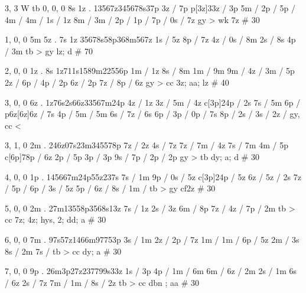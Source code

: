 3, 3
W 
tb  
0, 0, 0
8s 1z . 
13567z345678s37p
3z / 7p 
p[3z]33z / 3p
5m /
2p / 
5p / 
4m / 
4m /  
1s / 1z 
8m / 
3m / 
2p / 
1p / 
7p / 
0s / 7z 
gy > wk 
7z # 30 

1, 0, 0
5m 5z . 7s 1z
35678s58p368m567z 
1s / 5z 
8p / 7z 
4z / 
0s / 8m 
2s / 8s
4p / 3m 
tb > gy 
lz; d # 70 

2, 0, 0
1z . 8s
1z711s1589m22556p 
1m / 1z 
8s / 8m 
1m / 9m 
9m / 
4z / 
3m / 5p 
2z / 
6p / 
4p / 2p 
6z / 2p 
7z / 
8p / 6z 
gy > cc 
3z; aa; lz # 40

3, 0, 0
6z . 
1z76s2s66z33567m24p 
4z / 1z 
3z / 
5m / 4z 
c[3p]24p / 2s 
7s / 5m 
6p / 
p6z[6z]6z / 7s 
4p / 
5m / 5m 
6s / 
7z / 6s 
6p / 
3p / 
0p / 7s 
8p / 
2s / 
3s / 
2z / 
gy, cc <

3, 1, 0
2m . 
246z07s23m345578p
7z / 2z 
4s / 7z 
7z / 
7m / 4z 
7s / 7m 
4m / 5p 
c[6p]78p / 6z 
2p / 5p 
3p / 3p 
9s / 
7p / 
2p / 2p 
gy > tb 
dy; a; d # 30

4, 0, 0
1p . 
145667m24p55z237s 
7s / 1m 
9p / 
0s / 5z 
c[3p]24p / 5z 
6z / 
5z / 2s 
7z / 
5p / 
6p / 
3s / 5z 
5p / 
6z / 
8s / 
1m / 
tb > gy 
cf2z # 30 

5, 0, 0 
2m . 
27m13558p3568s13z 
7s / 1z 
2s / 3z 
6m / 8p 
7z / 
4z / 
7p / 2m 
tb > cc 
7z; 4z; hys, 2; dd; a # 30

6, 0, 0
7m . 
97s57z1466m97753p 
3s / 1m 
2z / 
2p / 7z 
1m / 
1m / 
6p / 5z 
2m  / 3s 
8s / 2m 
7s / 
tb > cc 
dy; a # 30

7, 0, 0
9p . 
26m3p27z237799s33z 
1s / 3p 
4p / 
1m / 6m 
6m / 
6z / 2m 
2s / 1m 
6s / 6z 
2s / 7z 
7m / 
1m / 
8s / 2z
tb > cc 
dbn ; aa # 30
